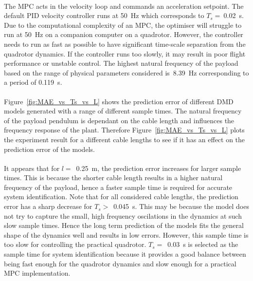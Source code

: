         \paragraph{}
        The MPC acts in the velocity loop and commands an acceleration setpoint.
        The default PID velocity controller runs at \SI{50}{\hertz} which corresponds to $T_s =~$\SI{0.02}{\second}.
        Due to the computational complexity of an MPC, the optimiser will struggle to run at \SI{50}{\hertz} on a companion computer on a quadrotor.
        However, the controller needs to run as fast as possible 
        to have significant time-scale separation from the quadrotor dynamics.
        If the controller runs too slowly, it may result in poor flight performance or unstable control.
        The highest natural frequency of the payload based on the range of physical parameters considered 
        is~\SI{8.39}{\hertz} corresponding to a period of \SI{0.119}{\second}.

        

        \paragraph{}
        Figure~\ref{fig:MAE_vs_Ts_vs_L} shows the prediction error of different DMD models 
        generated with a range of different sample times.
        The natural frequency of the payload pendulum is dependant on the cable length 
        and influences the frequency response of the plant.
        Therefore Figure~\ref{fig:MAE_vs_Ts_vs_L} plots the experiment result 
        for a different cable lengths to see if it has an effect on the prediction error of the models.

        \paragraph{}
        It appears that for $l =$~\SI{0.25}{\metre}, the prediction error increases for larger sample times.
        This is because the shorter cable length results in a higher natural frequency of the payload,
        hence a faster sample time is required for accurate system identification.
        Note that for all considered cable lengths, the prediction error has a sharp decrease for 
        $T_s >$~\SI{0.045}{\second}.
        This may be because the model does not try to capture the small, high frequency oscilations in the dynamics
        at such slow sample times.
        Hence the long term prediction of the models fits the general shape of the dynamics well and results in low errors.
        However, this sample time is too slow for controlling the practical quadrotor.
        $T_s =$~\SI{0.03}{\second} is selected as the sample time for system identification 
        because it provides a good balance between being fast enough for the quadrotor dynamics and slow enough for a practical MPC implementation.

